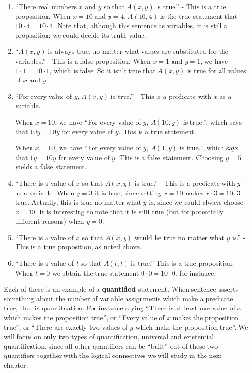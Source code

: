 \begin{solutions}
		\begin{enumerate}
			\item ``There real numbers $x$ and $y$ so that $A(x,y)$ is true.'' - This is a true proposition.  When $x = 10$ and $y = 4$, $A(10,4)$ is the true statement that $10 \cdot 4 = 10 \cdot 4$.  Note that, although this sentence as variables, it is still a proposition:  we could decide its truth value.
			\item ``$A(x,y)$ is always true, no matter what values are substituted for the variables.'' - This is a false proposition.  When $x = 1$ and $y = 1$, we have $1 \cdot 1 = 10 \cdot 1$, which is false.  So it isn't true that $A(x,y)$ is true for all values of $x$ and $y$.
			\item  ``For every value of  $y$,  $A(x,y)$ is true.'' - This is a predicate with $x$ as a variable.  
			
			When $x = 10$, we have ``For every value of  $y$,  $A(10,y)$ is true.'', which says that $10y = 10y$ for every value of $y$.  This is a true statement.
			
			When $x = 10$, we have ``For every value of  $y$,  $A(1,y)$ is true.'', which says that $1y = 10y$ for every value of $y$.  This is a false statement.  Choosing $y = 5$ yields a false statement.
			\item ``There is a value of $x$ so that $A(x,y)$ is true.'' - This is a predicate with $y$ as a variable.  When $y = 3$ it is true, since setting $x = 10$ makes $x \cdot 3 = 10 \cdot 3$ true.  Actually, this is true no matter what $y$ is, since we could always choose $x=10$.  It is interesting to note that it is still true (but for potentially different reasons) when $y = 0$.
			\item ``There is a value of $x$ so that $A(x,y)$ would be true no matter what $y$ is.'' - This is a true proposition, as noted above. 
			\item ``There is a value of $t$ so that $A(t,t)$ is true.''  This is a true proposition.  When $t = 0$ we obtain the true statement $0 \cdot 0 = 10 \cdot 0$, for instance.
		\end{enumerate}
	\end{solutions}

Each of these is an example of a \textbf{quantified} statement.  When sentence asserts something about the number of variable assignments which make a predicate true, that is quantification.  For instance saying ``There is at least one value of $x$ which makes the proposition true'', or ``Every value of $x$ makes the proposition true'', or ``There are exactly two values of $y$ which make the proposition true''.  We will focus on only two types of quantification, universal and existential quantification, since all other quantifiers can be ``built'' out of these two quantifiers together with the logical connectives we will study in the next chapter.

